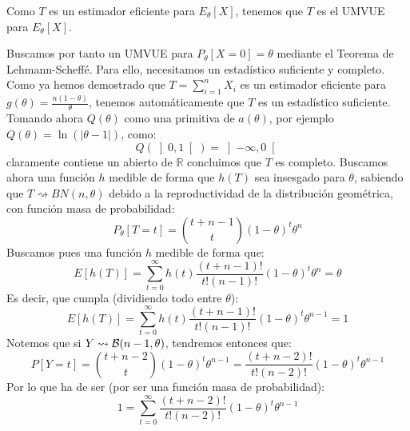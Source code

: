 \begin{ejercicio}
\begin{enumerate}
\begin{itemize}
                    Como $T$ es un estimador eficiente para $E_\theta[X]$, tenemos que $T$ es el UMVUE para $E_\theta[X]$.
            \end{itemize}

            Buscamos por tanto un UMVUE para $P_\theta[X=0] = \theta$ mediante el Teorema de Lehmann-Scheffé. Para ello, necesitamos un estadístico suficiente y completo. Como ya hemos demostrado que $T = \sum\limits_{i=1}^{n}X_i$ es un estimador eficiente para $g(\theta)=\frac{n(1-\theta)}{\theta}$, tenemos automáticamente que $T$ es un estadístico suficiente. Tomando ahora $Q(\theta)$ como una primitiva de $a(\theta)$, por ejemplo $Q(\theta) = \ln(|\theta-1|)$, como:
            \begin{equation*}
                Q(\left]0,1\right[) = \left]-\infty,0\right[
            \end{equation*}
            claramente contiene un abierto de $\mathbb{R}$ concluimos que $T$ es completo. Buscamos ahora una función $h$ medible de forma que $h(T)$ sea insesgado para $\theta$, sabiendo que $T\rightsquigarrow BN(n,\theta)$ debido a la reproductividad de la distribución geométrica, con función masa de probabilidad:
            \begin{equation*}
                P_\theta[T = t] = \binom{t+n-1}{t} {(1-\theta)}^{t}\theta^n
            \end{equation*}
            Buscamos pues una función $h$ medible de forma que:
            \begin{equation*}
                E[h(T)] = \sum_{t=0}^{\infty} h(t) \dfrac{(t+n-1)!}{t!(n-1)!}{(1-\theta)}^{t}\theta^n = \theta
            \end{equation*}
            Es decir, que cumpla (dividiendo todo entre $\theta$):
            \begin{equation*}
                E[h(T)] = \sum_{t=0}^{\infty} h(t) \dfrac{(t+n-1)!}{t!(n-1)!}{(1-\theta)}^{t}\theta^{n-1} = 1
            \end{equation*}
            Notemos que si $Y\rightsquigarrow \mathcal{B}(n-1,\theta)$, tendremos entonces que:
            \begin{equation*}
                P[Y=t] = \binom{t+n-2}{t}{(1-\theta)}^{t}\theta^{n-1} = \dfrac{(t+n-2)!}{t!(n-2)!}{(1-\theta)}^{t}\theta^{n-1}
            \end{equation*}
            Por lo que ha de ser (por ser una función masa de probabilidad):
            \begin{equation*}
                1 = \sum_{t=0}^{\infty}\dfrac{(t+n-2)!}{t!(n-2)!}{(1-\theta)}^{t}\theta^{n-1}

\end{equation*}
\end{enumerate}
\end{ejercicio}
